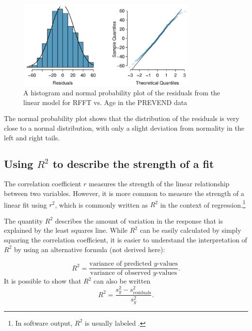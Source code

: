\begin{figure}[h!]
	\centering
	\includegraphics[width=0.8\textwidth]
	{ch_simple_linear_regression_oi_biostat/figures/prevendResidNormPlot/prevendResidNormPlot.pdf}
	\caption{A histogram and normal probability plot of the residuals from the linear model for RFFT vs. Age in the PREVEND data}
	\label{prevendResidNormPlot}
\end{figure}

The normal probability plot shows that the distribution of the residuals is very close to a normal distribution, with only a slight deviation from normality in the left and right tails.


\subsection{Using $R^2$ to describe the strength of a fit}
\label{RSquaredLinearRegression}


The correlation coefficient $r$ measures the strength of the linear relationship between two variables. However, it is more common to measure the strength of a linear fit using $r^2$, which is commonly written as $R^2$ in the context of regression.\footnote{In software output, $R^2$ is usually labeled .} 

The quantity $R^2$ describes the amount of variation in the response that is explained by the least squares line. While $R^2$ can be easily calculated by simply squaring the correlation coefficient, it is easier to understand the interpretation of $R^2$ by using an alternative formula (not derived here):

\[R^{2} = \dfrac{\text{variance of predicted $y$-values}}{\text{variance of observed $y$-values}}.\]
It is possible to show that $R^2$ can also be written
\[R^{2} = \dfrac{s^{2}_{y} - s_{\text{residuals}}^2}{s^{2}_{y}}.\]

